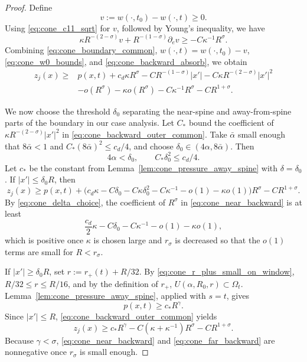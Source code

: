 \documentclass[11pt]{amsart}
\numberwithin{equation}{section}
\numberwithin{figure}{section}
\theoremstyle{plain}
\theoremstyle{definition}
\theoremstyle{remark}
\theoremstyle{plain}
\begin{document}
\begin{proof}
 Define
\[
    v:=w(\cdot,t_0)-w(\cdot,t)\geq0.
\]
Using \eqref{eq:cone_c11_sqrt} for \(v\), followed by Young's inequality, we have
\begin{equation}\label{eq:cone_backward_absorb}
    \kappa R^{-(2-\sigma)}v+R^{-(1-\sigma)}\partial_ev
    \geq -C\kappa^{-1}R^\sigma.
\end{equation}
Combining \eqref{eq:cone_boundary_common}, \(w(\cdot,t)=w(\cdot,t_0)-v\),
\eqref{eq:cone_w0_bounds}, and \eqref{eq:cone_backward_absorb}, we obtain
\begin{equation}\label{eq:cone_backward_outer_common}
    \begin{aligned}
    z_j(x)\geq{}&p(x,t)+c_d\kappa R^\sigma
    -CR^{-(1-\sigma)}|x'|
    -C\kappa R^{-(2-\sigma)}|x'|^2\\
    &-o(R^\sigma)-\kappa o(R^\sigma)
    -C\kappa^{-1}R^\sigma-CR^{1+\sigma}.
    \end{aligned}
\end{equation}

We now choose the threshold \(\delta_0\) separating the near-spine and
away-from-spine parts of the boundary in our case analysis. Let \(C_*\) bound
the coefficient of \(\kappa R^{-(2-\sigma)}|x'|^2\) in
\eqref{eq:cone_backward_outer_common}. Take \(\bar\alpha\) small enough that \(8\bar\alpha<1\) and
\(C_*(8\bar\alpha)^2\leq c_d/4\), and choose
\(\delta_0\in(4\alpha,8\bar\alpha)\). Then
\begin{equation}\label{eq:cone_delta_choice}
    4\alpha<\delta_0,
    \qquad
    C_*\delta_0^2\leq c_d/4 .
\end{equation}
Let \(c_*\) be the constant from
Lemma~\ref{lem:cone_pressure_away_spine} with \(\delta=\delta_0\). If \(|x'|\leq\delta_0R\), then
\begin{equation}\label{eq:cone_near_backward}
    z_j(x)\geq p(x,t)
    +\bigl(c_d\kappa-C\delta_0-C\kappa\delta_0^2-C\kappa^{-1}-o(1)-\kappa o(1)\bigr)R^\sigma
    -CR^{1+\sigma}.
\end{equation}
By \eqref{eq:cone_delta_choice}, the coefficient of \(R^\sigma\) in
\eqref{eq:cone_near_backward} is at least
\[
    \frac{c_d}{2}\kappa-C\delta_0-C\kappa^{-1}-o(1)-\kappa o(1),
\]
which is positive once \(\kappa\) is chosen large and \(r_\sigma\) is
decreased so that the \(o(1)\) terms are small for \(R<r_\sigma\).





If \(|x'|\geq\delta_0R\), set
\(r:=r_+(t)+R/32\). By
\eqref{eq:cone_r_plus_small_on_window}, \(R/32\leq r\leq R/16\), and by
the definition of \(r_+\), \(U(\alpha,R_0,r)\subset\Omega_t\).
Lemma~\ref{lem:cone_pressure_away_spine}, applied with \(s=t\), gives
\[
    p(x,t)\geq c_*R^\gamma.
\]
Since \(|x'|\leq R\), \eqref{eq:cone_backward_outer_common} yields
\begin{equation}\label{eq:cone_far_backward}
    z_j(x)\geq
    c_*R^\gamma-C(\kappa+\kappa^{-1})R^\sigma-CR^{1+\sigma}.
\end{equation}
Because \(\gamma<\sigma\), \eqref{eq:cone_near_backward} and
\eqref{eq:cone_far_backward} are nonnegative once \(r_\sigma\) is small enough.


\end{proof}
\end{document}
